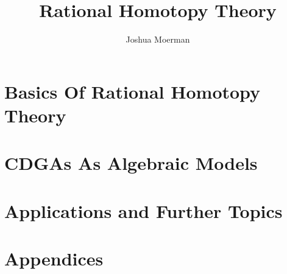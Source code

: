 \documentclass[a4paper,12pt,footinclude=true,headinclude=true,oneside,dottedtoc]{scrbook}
\title{Rational Homotopy Theory}
\author{Joshua Moerman}
\begin{document}

\maketitle



\part{Basics Of Rational Homotopy Theory}


\part{CDGAs As Algebraic Models}


\part{Applications and Further Topics}


\appendix
\part{Appendices}


\listoftodos



\end{document}
